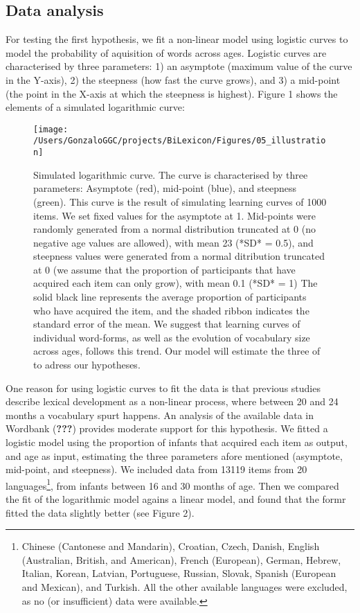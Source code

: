 \documentclass[english,man,man,floatsintext]{apa6}
\begin{document}
\hypertarget{data-analysis}{%
\subsection{Data analysis}\label{data-analysis}}

For testing the first hypothesis, we fit a non-linear model using logistic curves to model the probability of aquisition of words across ages. Logistic curves are characterised by three parameters: 1) an asymptote (maximum value of the curve in the Y-axis), 2) the steepness (how fast the curve grows), and 3) a mid-point (the point in the X-axis at which the steepness is highest). Figure 1 shows the elements of a simulated logarithmic curve:

\begin{figure}

{\centering \texttt{[image: /Users/GonzaloGGC/projects/BiLexicon/Figures/05\_illustration]} 

}

\caption{Simulated logarithmic curve. The curve is characterised by three parameters: Asymptote (red), mid-point (blue), and steepness (green). This curve is the result of simulating learning curves of 1000 items. We set fixed values for the asymptote at 1. Mid-points were randomly generated from a normal distribution truncated at 0 (no negative age values are allowed), with mean 23 (*SD* = 0.5), and steepness values were generated from a normal ditribution truncated at 0 (we assume that the proportion of participants that have acquired each item can only grow), with mean 0.1 (*SD* = 1) The solid black line represents the average proportion of participants who have acquired the item, and the shaded ribbon indicates the standard error of the mean. We suggest that learning curves of individual word-forms, as well as the evolution of vocabulary size across ages, follows this trend. Our model will estimate the three of to adress our hypotheses.}\label{fig:logcurve}
\end{figure}

One reason for using logistic curves to fit the data is that previous studies describe lexical development as a non-linear process, where between 20 and 24 months a vocabulary spurt happens. An analysis of the available data in Wordbank ({\textbf{???}}) provides moderate support for this hypothesis. We fitted a logistic model using the proportion of infants that acquired each item as output, and age as input, estimating the three parameters afore mentioned (asymptote, mid-point, and steepness). We included data from 13119 items from 20 languages\footnote{Chinese (Cantonese and Mandarin), Croatian, Czech, Danish, English (Australian, British, and American), French (European), German, Hebrew, Italian, Korean, Latvian, Portuguese, Russian, Slovak, Spanish (European and Mexican), and Turkish. All the other available languages were excluded, as no (or insufficient) data were available.}, from infants between 16 and 30 months of age. Then we compared the fit of the logarithmic model agains a linear model, and found that the formr fitted the data slightly better (see Figure 2).
\end{document}
